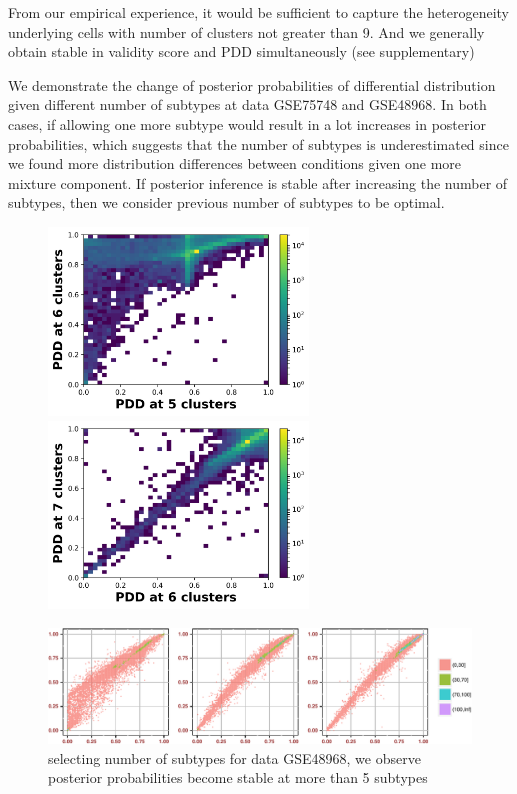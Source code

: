 \documentclass[aoas,preprint]{imsart}
\begin{document}
From our empirical experience, it would be sufficient to capture the heterogeneity underlying cells with number of clusters not greater than 9.  And we generally obtain stable in validity score and PDD simultaneously (see supplementary)


We demonstrate the change of posterior probabilities of differential distribution given different number of subtypes at data GSE75748 and GSE48968. In both cases, if allowing one more subtype would result in a lot increases in posterior probabilities, which suggests that the number of subtypes is underestimated since we found more distribution differences between conditions given one more mixture component. If posterior inference is stable after increasing the number of subtypes, then we consider previous number of subtypes to be optimal.



\begin{figure}[h!]

  \includegraphics[height = 5cm, width=\linewidth]{Figs/G48_56.png}
\endminipage\hfill
{}
  \includegraphics[height = 5cm, width=\linewidth]{Figs/G48_67.png}
\endminipage\hfill


\includegraphics[width = 1\textwidth]{Figs/s_789_GSE48968.pdf}

\caption{selecting number of subtypes for data GSE48968, we observe posterior probabilities become stable at more than 5 subtypes}
\end{figure}
\end{document}
